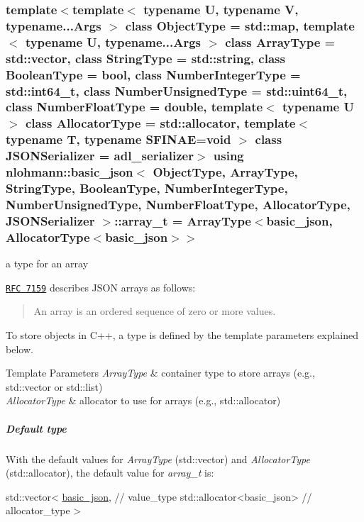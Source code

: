 \subsubsection[{\texorpdfstring{array\+\_\+t}{array_t}}]{\setlength{\rightskip}{0pt plus 5cm}template$<$template$<$ typename U, typename V, typename...\+Args $>$ class Object\+Type = std\+::map, template$<$ typename U, typename...\+Args $>$ class Array\+Type = std\+::vector, class String\+Type  = std\+::string, class Boolean\+Type  = bool, class Number\+Integer\+Type  = std\+::int64\+\_\+t, class Number\+Unsigned\+Type  = std\+::uint64\+\_\+t, class Number\+Float\+Type  = double, template$<$ typename U $>$ class Allocator\+Type = std\+::allocator, template$<$ typename T, typename S\+F\+I\+N\+A\+E=void $>$ class J\+S\+O\+N\+Serializer = adl\+\_\+serializer$>$ using {\bf nlohmann\+::basic\+\_\+json}$<$ Object\+Type, Array\+Type, String\+Type, Boolean\+Type, Number\+Integer\+Type, Number\+Unsigned\+Type, Number\+Float\+Type, Allocator\+Type, J\+S\+O\+N\+Serializer $>$\+::{\bf array\+\_\+t} =  Array\+Type$<${\bf basic\+\_\+json}, Allocator\+Type$<${\bf basic\+\_\+json}$>$$>$}\hypertarget{classnlohmann_1_1basic__json_a4c409f1b6d9caf3412c78af9a5883fed}{}\label{classnlohmann_1_1basic__json_a4c409f1b6d9caf3412c78af9a5883fed}


a type for an array 

\href{http://rfc7159.net/rfc7159}{\tt R\+FC 7159} describes J\+S\+ON arrays as follows\+: \begin{quote}
An array is an ordered sequence of zero or more values. \end{quote}


To store objects in C++, a type is defined by the template parameters explained below.


\begin{DoxyTemplParams}{Template Parameters}
{\em Array\+Type} & container type to store arrays (e.\+g., {\ttfamily std\+::vector} or {\ttfamily std\+::list}) \\
\hline
{\em Allocator\+Type} & allocator to use for arrays (e.\+g., {\ttfamily std\+::allocator})\\
\hline
\end{DoxyTemplParams}
\subparagraph*{Default type}

With the default values for {\itshape Array\+Type} ({\ttfamily std\+::vector}) and {\itshape Allocator\+Type} ({\ttfamily std\+::allocator}), the default value for {\itshape array\+\_\+t} is\+:


\begin{DoxyCode}
std::vector<
  \hyperlink{classnlohmann_1_1basic__json_aed115142bd0c6c66c864700e0467df55}{basic\_json}, \textcolor{comment}{// value\_type}
  std::allocator<basic\_json> \textcolor{comment}{// allocator\_type}
>
\end{DoxyCode}


